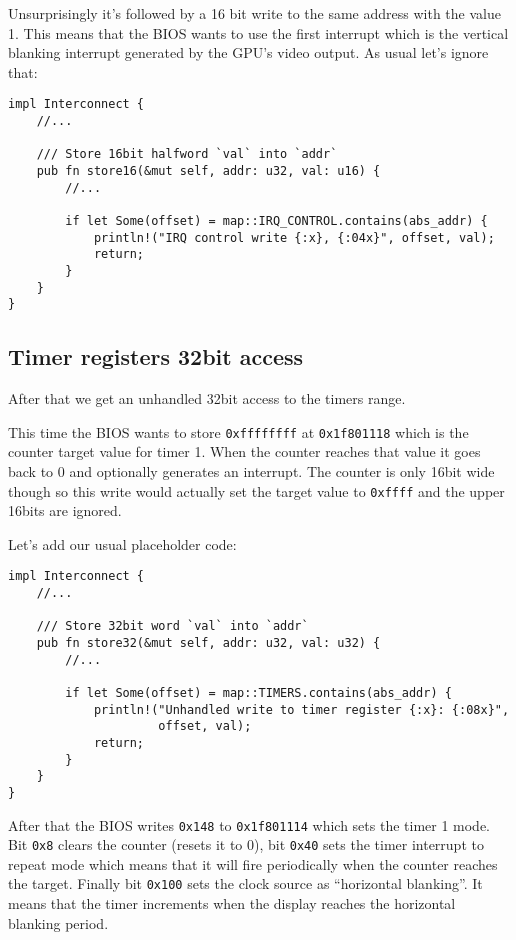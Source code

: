 \documentclass[a4paper]{article}
\newcommand{\code}[1] {\texttt{#1}}
\begin{document}
Unsurprisingly it's followed by a 16 bit write to the same address
with the value 1. This means that the BIOS wants to use the first
interrupt which is the vertical blanking interrupt generated by the
GPU's video output. As usual let's ignore that:

\begin{lstlisting}
impl Interconnect {
    //...

    /// Store 16bit halfword `val` into `addr`
    pub fn store16(&mut self, addr: u32, val: u16) {
        //...

        if let Some(offset) = map::IRQ_CONTROL.contains(abs_addr) {
            println!("IRQ control write {:x}, {:04x}", offset, val);
            return;
        }
    }
}
\end{lstlisting}

\subsection{Timer registers 32bit access}

After that we get an unhandled 32bit access to the timers range.

This time the BIOS wants to store \code{0xffffffff} at
\code{0x1f801118} which is the counter target value for timer 1. When
the counter reaches that value it goes back to 0 and optionally
generates an interrupt. The counter is only 16bit wide though so this
write would actually set the target value to \code{0xffff} and the
upper 16bits are ignored.

Let's add our usual placeholder code:

\begin{lstlisting}
impl Interconnect {
    //...

    /// Store 32bit word `val` into `addr`
    pub fn store32(&mut self, addr: u32, val: u32) {
        //...

        if let Some(offset) = map::TIMERS.contains(abs_addr) {
            println!("Unhandled write to timer register {:x}: {:08x}",
                     offset, val);
            return;
        }
    }
}
\end{lstlisting}

After that the BIOS writes \code{0x148} to \code{0x1f801114} which
sets the timer 1 mode. Bit \code{0x8} clears the counter (resets it to
0), bit \code{0x40} sets the timer interrupt to repeat mode which
means that it will fire periodically when the counter reaches the
target. Finally bit \code{0x100} sets the clock source as ``horizontal
blanking''. It means that the timer increments when the display
reaches the horizontal blanking period.
\end{document}
